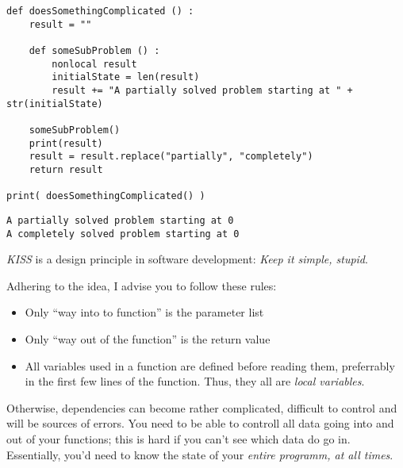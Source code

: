 
\begin{frame}[fragile]
%
\begin{codebox}
\begin{verbatim}
def doesSomethingComplicated () :
    result = ""
    
    def someSubProblem () :
        nonlocal result
        initialState = len(result)
        result += "A partially solved problem starting at " + str(initialState)
    
    someSubProblem()
    print(result)
    result = result.replace("partially", "completely")
    return result

print( doesSomethingComplicated() )
\end{verbatim}
\end{codebox}

\vspace{-12pt}
\begin{cmdbox}
\begin{verbatim}
A partially solved problem starting at 0
A completely solved problem starting at 0
\end{verbatim}
\end{cmdbox}
%
\end{frame}


\begin{frame}
%
\begin{hintbox}
\emph{KISS} is a design principle in software development: \emph{Keep it simple, stupid}.

Adhering to the idea, I advise you to follow these rules:

\begin{itemize}
\item Only \enquote{way into to function} is the parameter list
\item Only \enquote{way out of the function} is the return value
\item All variables used in a function are defined before reading them, preferrably in the first few lines of the function. Thus, they all are \emph{local variables}.
\end{itemize}

Otherwise, dependencies can become rather complicated, difficult to control and will be sources of errors. You need to be able to controll all data going into and out of your functions; this is hard if you can't see which data do go in. Essentially, you'd need to know the state of your \emph{entire programm, at all times}.
\end{hintbox}
%
\end{frame}

